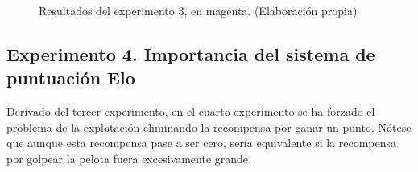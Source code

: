 \begin{figure} [H]
 \centering
 \caption[Resultados del experimento 3]{Resultados del experimento 3, en magenta. (Elaboración propia)}
  \label{fig:exp3-plots}
\end{figure}

\subsection{Experimento 4. Importancia del sistema de puntuación Elo}

Derivado del tercer experimento, en el cuarto experimento se ha forzado el problema de la explotación eliminando la recompensa por ganar un punto. Nótese que aunque esta recompensa pase a ser cero, sería equivalente si la recompensa por golpear la pelota fuera excesivamente grande.

